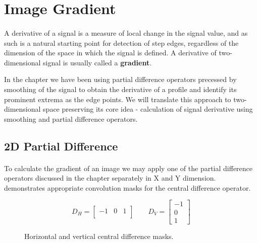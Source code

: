 \section{Image Gradient}

\paragraph*{}
A derivative of a signal is a measure of local change in the signal value, and as such is a natural starting point for detection of step edges, regardless of the dimension of the space in which the signal is defined. A derivative of two-dimensional signal is usually called a \textbf{gradient}. 

In the  chapter we have been using partial difference operators precessed by smoothing of the signal to obtain the derivative of a profile and identify its prominent extrema as the edge points. We will translate this approach to two-dimensional space preserving its core idea - calculation of signal derivative using smoothing and partial difference operators.

\subsection{2D Partial Difference}

\paragraph*{}
To calculate the gradient of an image we may apply one of the partial difference operators discussed in the  chapter separately in X and Y dimension.  demonstrates appropriate convolution masks for the central difference operator.

\begin{figure}[h!]
\begin{equation*}
D_{H} = 
	\begin{bmatrix}
	-1 & 0 & 1 \\
	\end{bmatrix}\qquad
D_{V} = 
	\begin{bmatrix}
	-1 \\
	0 \\
	1
	\end{bmatrix}
\end{equation*}
\caption{Horizontal and vertical central difference masks.}
\label{fig:CentralDifferenceMasks}
\end{figure}

